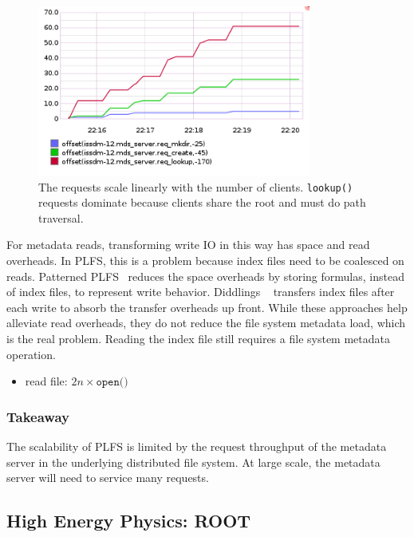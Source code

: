\begin{figure}[tb]
\centering
  \includegraphics[width=90mm]{figures/prob_reqs.png} 
  \caption{The requests scale linearly with the number of clients.
  \texttt{lookup()} requests dominate because clients share the root and must do
  path traversal.
  }\label{fig:arch}
\end{figure}

For metadata reads, transforming write IO in this way has space and read
overheads. In PLFS, this is a problem because index files need to be coalesced
on reads.  Patterned PLFS~\cite{he:hpdc13-plfs-patterns} reduces the space
overheads by storing formulas, instead of index files, to represent write
behavior. Diddlings ~\cite{grider:pc17-diddlings} transfers index files after
each write to absorb the transfer overheads up front. While these approaches
help alleviate read overheads, they do not reduce the file system metadata
load, which is the real problem. Reading the index file still requires a file
system metadata operation.

\begin{itemize}
  \item read file: \(2n \times \texttt{open()}\) 
\end{itemize}

\subsubsection*{Takeaway} The scalability of PLFS is limited by the request
throughput of the metadata server in the underlying distributed file system. At
large scale, the metadata server will need to service many requests.

\subsection{High Energy Physics: ROOT}

